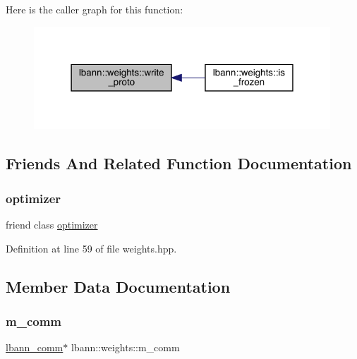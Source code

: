 Here is the caller graph for this function\+:\nopagebreak
\begin{figure}[H]
\begin{center}
\leavevmode
\includegraphics[width=315pt]{classlbann_1_1weights_a1a2631987f38d32a90fbee61053a04cc_icgraph}
\end{center}
\end{figure}


\subsection{Friends And Related Function Documentation}
\mbox{\label{classlbann_1_1weights_afe38b5936c7fe885023474dd92c72c67}} 
\subsubsection{\texorpdfstring{optimizer}{optimizer}}
{\footnotesize\ttfamily friend class \hyperlink{classlbann_1_1optimizer}{optimizer}\hspace{0.3cm}{\ttfamily [friend]}}



Definition at line 59 of file weights.\+hpp.



\subsection{Member Data Documentation}
\mbox{\label{classlbann_1_1weights_a223e8907034888392548ae901222b39c}} 
\subsubsection{\texorpdfstring{m\+\_\+comm}{m\_comm}}
{\footnotesize\ttfamily \hyperlink{classlbann_1_1lbann__comm}{lbann\+\_\+comm}$\ast$ lbann\+::weights\+::m\+\_\+comm\hspace{0.3cm}{\ttfamily [private]}}

